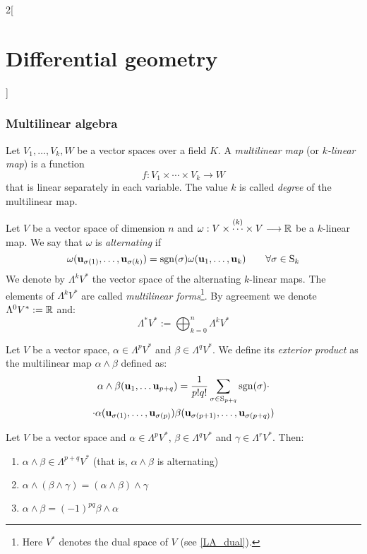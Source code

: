 \documentclass[../../../main.tex]{subfiles}
\begin{document}
\begin{multicols}{2}[\section{Differential geometry}]
  \subsubsection{Multilinear algebra}
  \begin{definition}
    Let $V_1,\ldots,V_k,W$ be a vector spaces over a field $K$. A \emph{multilinear map} (or \emph{$k$-linear map}) is a function $$f:V_1\times\cdots\times V_k\longrightarrow W$$ that is linear separately in each variable. The value $k$ is called \emph{degree} of the multilinear map.
  \end{definition}
  \begin{definition}
    Let $V$ be a vector space of dimension $n$ and $\omega:V\times\overset{(k)}{\cdots}\times V\longrightarrow \mathbb{R}$ be a $k$-linear map. We say that $\omega$ is \emph{alternating} if $$\omega(\boldsymbol{\mathrm{u}}_{\sigma(1)},\ldots,\boldsymbol{\mathrm{u}}_{\sigma(k)})=\operatorname{sgn}(\sigma)\omega(\boldsymbol{\mathrm{u}}_1,\ldots,\boldsymbol{\mathrm{u}}_k)\qquad\forall\sigma\in \text{S}_k$$
    We denote by $\Lambda^kV^*$ the vector space of the alternating $k$-linear maps. The elements of $\Lambda^kV^*$ are called \emph{multilinear forms}\footnote{Here $V^*$ denotes the dual space of $V$ (see \cref{LA_dual}).}. By agreement we denote $\Lambda^0V^*:=\mathbb{R}$ and: $$\Lambda^*V^*:=\bigoplus_{k=0}^{n}\Lambda^kV^*$$
  \end{definition}
  \begin{definition}
    Let $V$ be a vector space, $\alpha\in\Lambda^pV^*$ and $\beta\in\Lambda^qV^*$. We define its \emph{exterior product} as the multilinear map $\alpha\wedge\beta$ defined as:
    \begin{multline*}
      \alpha\wedge\beta(\boldsymbol{\mathrm{u}}_1,\ldots\boldsymbol{\mathrm{u}}_{p+q})=\frac{1}{p!q!}\sum_{\sigma\in \text{S}_{p+q}}\operatorname{sgn}(\sigma)\cdot\\\cdot\alpha(\boldsymbol{\mathrm{u}}_{\sigma(1)},\ldots,\boldsymbol{\mathrm{u}}_{\sigma(p)})\beta(\boldsymbol{\mathrm{u}}_{\sigma(p+1)},\ldots,\boldsymbol{\mathrm{u}}_{\sigma(p+q)})
    \end{multline*}
  \end{definition}
  \begin{proposition}
    Let $V$ be a vector space and $\alpha\in\Lambda^pV^*$, $\beta\in\Lambda^qV^*$ and $\gamma\in\Lambda^rV^*$. Then:
    \begin{enumerate}
      \item $\alpha\wedge\beta\in\Lambda^{p+q}V^*$ (that is, $\alpha\wedge\beta$ is alternating)
      \item $\alpha\wedge(\beta\wedge\gamma)=(\alpha\wedge\beta)\wedge\gamma$
      \item $\alpha\wedge\beta={(-1)}^{pq}\beta\wedge\alpha$

\end{enumerate}
\end{proposition}
\end{multicols}
\end{document}
